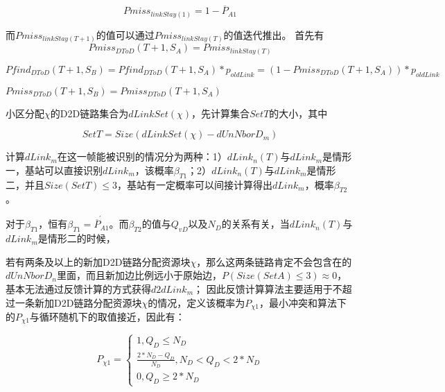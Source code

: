 \documentclass[figurelist,tablelist,algorithmlist,nomlist,masters]{seuthesix}
\begin{document}
	\begin{equation}\label{eq3.1}
	Pmiss_{linkStay(1)} = 1 - \overline P _{A1}
	\end{equation}

	而$Pmiss_{linkStay(T + 1)}$的值可以通过$Pmiss_{linkStay(T)}$的值迭代推出。
	首先有
	\begin{equation}\label{eq3.1}
	Pmis{s_{DToD}}(T + 1,S_A) = Pmis{s_{linkStay(T)}}
	\end{equation}

	\begin{equation}\label{eq3.1}
		Pfin{d_{DToD}}(T + 1,S_B) = Pfin{d_{DToD}}(T + 1,S_A)*{p_{oldLink}} = (1 - Pmis{s_{DToD}}(T + 1,S_A))*{p_{oldLink}}
	\end{equation}

	$Pmis{s_{DToD}}(T + 1,S_B) = Pmis{s_{DToD}}(T + 1,S_A)$


	小区分配$\chi $的D2D链路集合为$dLinkSet(\chi )$，先计算集合$SetT$的大小，其中

	\begin{equation}\label{eq3.1}
	SetT  = Size(dLinkSet(\chi ) - dUnNborD_m)
	\end{equation}

	计算$dLink_m$在这一帧能被识别的情况分为两种：1）$dLink_n(T)$与$dLink_m$是情形一，基站可以直接识别$dLink_m$，该概率$\beta _{T1}$；2）$dLink_n(T)$与$dLink_m$是情形二，并且$Size(SetT) \le 3$，基站有一定概率可以间接计算得出$dLink_m$，概率$\beta _{T2}$。

	对于$\beta _{T1}$，恒有$\beta _{T1} = \acute{\overline P _{A1}}$。而$\beta _{T2}$的值与$Q_{vD}$以及$N_D$的关系有关，当$dLink_n(T)$与$dLink_m$是情形二的时候，

	若有两条及以上的新加D2D链路分配资源块$\chi $，那么这两条链路肯定不会包含在的$dUnNborD_n$里面，而且新加边比例远小于原始边，$P(Size(SetA) \le 3) \approx 0$，基本无法通过反馈计算的方式获得$d2dLin{k_m}$；
	因此反馈计算算法主要适用于不超过一条新加D2D链路分配资源块$\chi $的情况，定义该概率为$P_{\chi 1}$，最小冲突和算法下的$P_{\chi 1}$与循环随机下的取值接近，因此有：

	\begin{equation}\label{eq3.1}
		P_{\chi 1} = \left\{ \begin{array}{l}
		1,Q_D \le N_D\\
		\frac{{2*N_D - Q_D}}{{N_D}},N_D < Q_D < 2*N_D\\
		0,Q_D \ge 2*N_D
		\end{array} \right.
	\end{equation}
\end{document}
